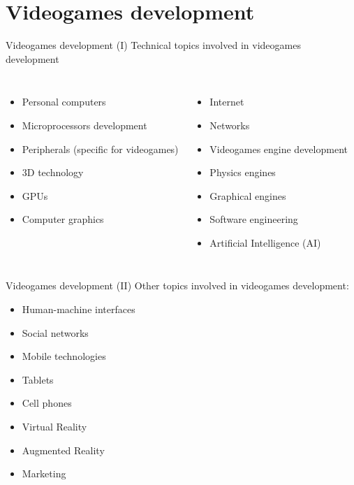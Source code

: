 \documentclass[10pt,compress]{beamer} %
\begin{document}
\section{Videogames development}
\begin{frame}{Videogames development (I)}
	Technical topics involved in videogames development

    \begin{columns}
	\begin{itemize}
		\item Personal computers
		\item Microprocessors development
		\item Peripherals (specific for videogames)
		\item 3D technology 
        \item GPUs
        \item Computer graphics
    \end{itemize}


    \begin{itemize}
		\item Internet
        \item Networks
		\item Videogames engine development
		\item Physics engines
		\item Graphical engines
		\item Software engineering
		\item Artificial Intelligence (AI)
	\end{itemize}
	\end{columns}
\end{frame}

\begin{frame}{Videogames development (II)}
	Other topics involved in videogames development:
	\begin{itemize}
		\item Human-machine interfaces
		\item Social networks
		\item Mobile technologies
		\item Tablets
        \item Cell phones
        \item Virtual Reality
        \item Augmented Reality
        \item Marketing
	\end{itemize}
\end{frame}
\end{document}
